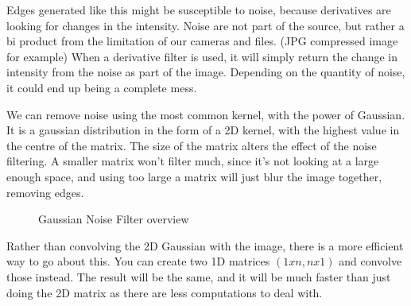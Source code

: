 Edges generated like this might be susceptible to noise, because derivatives are looking for changes in the intensity. Noise are not part of the source, but rather a bi product from the limitation of our cameras and files. (JPG compressed image for example) When a derivative filter is used, it will simply return the change in intensity from the noise as part of the image. Depending on the quantity of noise, it could end up being a complete mess.

We can remove noise using the most common kernel, with the power of Gaussian. It is a gaussian distribution in the form of a 2D kernel, with the highest value in the centre of the matrix. The size of the matrix alters the effect of the noise filtering. A smaller matrix won't filter much, since it's not looking at a large enough space, and using too large a matrix will just blur the image together, removing edges.
\begin{figure}[!htb]
	\caption{\label{fig:noiseMat}Gaussian Noise Filter overview}
\end{figure}

Rather than convolving the 2D Gaussian with the image, there is a more efficient way to go about this. You can create two 1D matrices $(1xn, nx1)$ and convolve those instead. The result will be the same, and it will be much faster than just doing the 2D matrix as there are less computations to deal with.

